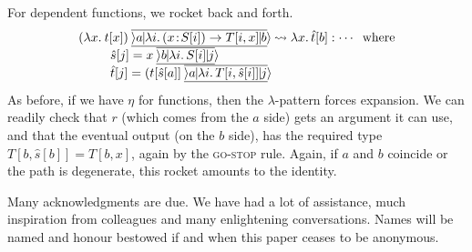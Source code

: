 \documentclass{sigplanconf}
\newcommand{\hb}{\!:\!}
\begin{document}
For dependent functions, we rocket back and forth.
\[\begin{array}{l}
\xp{(\lambda x.\:t[x])}a{\lambda i.\,(x\hb S[i])\to T[i,x]}b \leadsto
  \lambda x.\, \hat t[b]:\cdots\;\;\textrm{where} \\
\qquad\begin{array}{l}
  \hat s[j]= \xp x b {\lambda i.\,S[i]} j \\
  \hat t[j]= \xp {(t[\hat s[a]]} a {\lambda i.\,T[i,\hat s[i]]} j \\
\end{array}
\end{array}\]
As before, if we have $\eta$ for functions, then the $\lambda$-pattern
forces expansion. We can readily check that $r$ (which comes from the
$a$ side) gets an argument it can use, and that the eventual output (on the $b$ side),
has the required type $T[b,\hat s[b]] = T[b,x]$, again by the
\textsc{go-stop}
rule. Again, if $a$ and $b$ coincide or the path is degenerate, this
rocket amounts to the identity.


%

\acks

Many acknowledgments are due. We have had a lot of assistance, much
inspiration from colleagues and many enlightening conversations. Names
will be named and honour bestowed if and when this paper ceases to be
anonymous.







%
%
\end{document}
